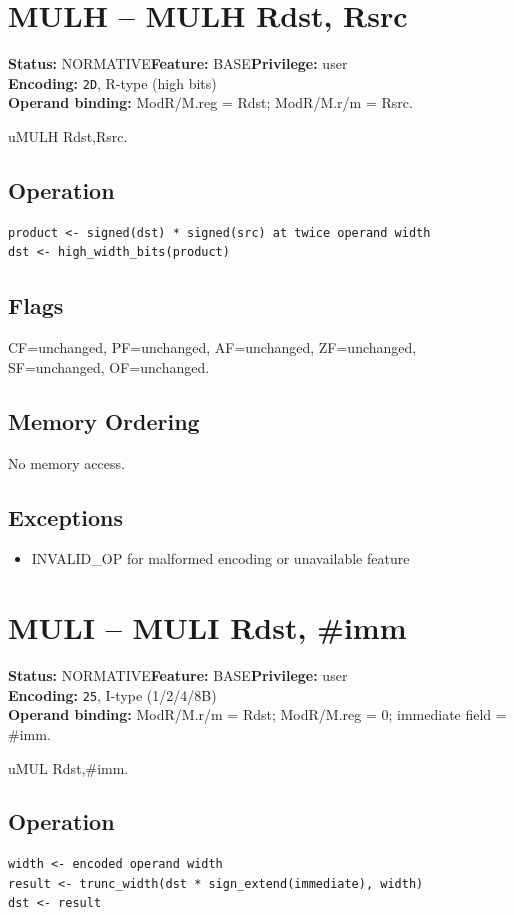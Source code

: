 \documentclass[10pt]{article}
\begin{document}
\section{MULH -- MULH Rdst, Rsrc}
\textbf{Status:} NORMATIVE\quad \textbf{Feature:} BASE\quad \textbf{Privilege:} user\\
\textbf{Encoding:} \texttt{2D}, R-type (high bits)\\
\textbf{Operand binding:} ModR/M.reg = Rdst; ModR/M.r/m = Rsrc.

uMULH Rdst,Rsrc.

\subsection*{Operation}
\begin{lstlisting}
product <- signed(dst) * signed(src) at twice operand width
dst <- high_width_bits(product)
\end{lstlisting}
\subsection*{Flags}
CF=unchanged, PF=unchanged, AF=unchanged, ZF=unchanged, SF=unchanged, OF=unchanged.
\subsection*{Memory Ordering}
No memory access.
\subsection*{Exceptions}
\begin{itemize}
\item INVALID\_OP for malformed encoding or unavailable feature
\end{itemize}
\clearpage

\section{MULI -- MULI Rdst, \#imm}
\textbf{Status:} NORMATIVE\quad \textbf{Feature:} BASE\quad \textbf{Privilege:} user\\
\textbf{Encoding:} \texttt{25}, I-type (1/2/4/8B)\\
\textbf{Operand binding:} ModR/M.r/m = Rdst; ModR/M.reg = 0; immediate field = \#imm.

uMUL Rdst,\#imm.

\subsection*{Operation}
\begin{lstlisting}
width <- encoded operand width
result <- trunc_width(dst * sign_extend(immediate), width)
dst <- result
\end{lstlisting}
\end{document}
